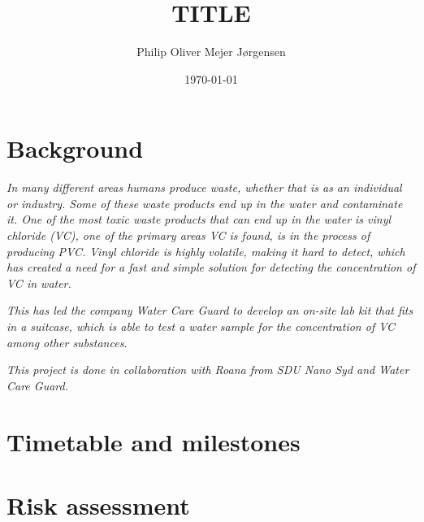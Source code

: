 \documentclass{article}
\title{TITLE}
\author{Philip Oliver Mejer Jørgensen}
\date{\today}
\begin{document}
\maketitle

\section{Background}
\textit{In many different areas humans produce waste, whether that is as an individual or industry. Some of these waste products end up in the water and contaminate it. One of the most toxic waste products that can end up in the water is vinyl chloride (VC), one of the primary areas VC is found, is in the process of producing PVC. Vinyl chloride is highly volatile, making it hard to detect, which has created a need for a fast and simple solution for detecting the concentration of VC in water.}

\textit{This has led the company Water Care Guard to develop an on-site lab kit that fits in a suitcase, which is able to test a water sample for the concentration of VC among other substances.}

\textit{This project is done in collaboration with Roana from SDU Nano Syd and Water Care Guard.}

\section{Timetable and milestones}

\section{Risk assessment}
\end{document}
